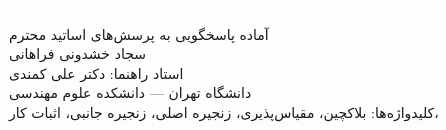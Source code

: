 \documentclass[12pt]{article}
\newcommand{\newslide}{\clearpage}
\begin{document}
\newslide
\thispagestyle{empty}
\vspace*{18mm}
\begin{center}
{\Huge\textbf{\textcolor{white}{با سپاس از توجه شما}}}\\[8mm]
{\LARGE\textcolor{UTgold}{آماده پاسخگویی به پرسش‌های اساتید محترم}}\\[14mm]
{\large\textcolor{UTsoft}{سجاد خشدونی فراهانی}}\\[2mm]
{\normalsize\textcolor{UTsoft}{استاد راهنما: دکتر علی کمندی}}\\[1mm]
{\normalsize\textcolor{UTsoft}{دانشگاه تهران — دانشکده علوم مهندسی}}\\[8mm]
\textcolor{UTsoft}{کلیدواژه‌ها: بلاکچین، مقیاس‌پذیری، زنجیره اصلی، زنجیره جانبی، اثبات کار، }
\end{center}
\end{document}
